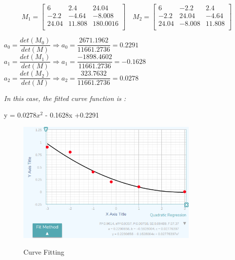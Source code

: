 \[
 M_{1} = \begin{bmatrix}
6 & 2.4 & 24.04 \\
-2.2 & -4.64 & -8.008 \\
24.04 & 11.808 & 180.0016 \\

\end{bmatrix} \quad
 M_{2} = \begin{bmatrix}
6 & -2.2 & 2.4 \\
-2.2 & 24.04 & -4.64 \\
24.04 & -8.008 & 11.808 \\

\end{bmatrix}
\]

$ a_{0} = \dfrac{det(M_{0})}{det(M)}   \Longrightarrow  a_{0} = \dfrac{ 2671.1962}{11661.2736} = 0.2291$  \vfill 
$ a_{1} = \dfrac{det(M_{1})}{det(M)} \Longrightarrow  a_{1} = \dfrac{ -1898.4602}{11661.2736} = -0.1628$  \vfill 
$ a_{2} = \dfrac{det(M_{2})}{det(M)} \Longrightarrow  a_{2} = \dfrac{ 323.7632}{11661.2736} = 0.0278$

\emph{\color{blue}In this case, the fitted curve function is :} \vfill 
\begin{center}
y = 0.0278$x^{2} $ - 0.1628x +0.2291
\end{center}

\begin{figure}[H]
 \centering
  \includegraphics[width=0.8\textwidth]{./Bilder/Curve_Fitting.png}\label{Curve_Fitting}
  \caption{Curve Fitting\cite{Curve_Fitting_Plot}}
\end{figure}




%




